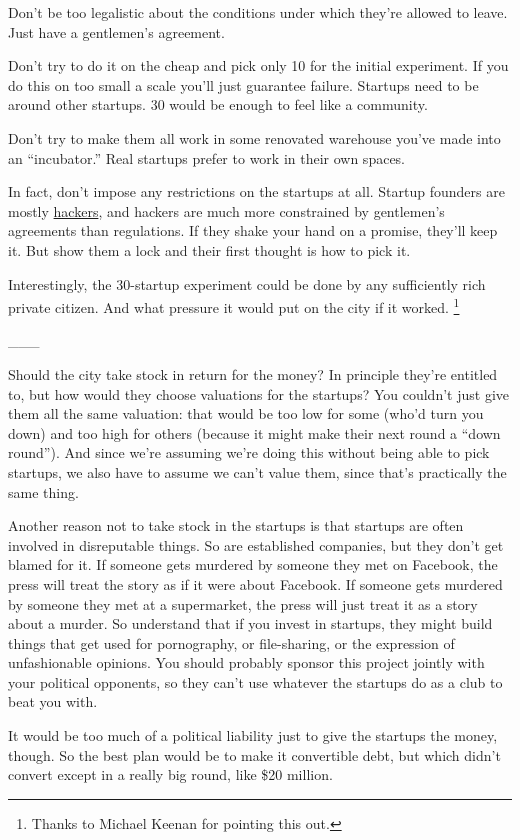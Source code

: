 \documentclass[12pt]{book}
\begin{document}
Don't be too legalistic about the conditions under which they're allowed
to leave. Just have a gentlemen's agreement.

Don't try to do it on the cheap and pick only 10 for the initial
experiment. If you do this on too small a scale you'll just guarantee
failure. Startups need to be around other startups. 30 would be enough
to feel like a community.

Don't try to make them all work in some renovated warehouse you've made
into an ``incubator.'' Real startups prefer to work in their own spaces.

In fact, don't impose any restrictions on the startups at all. Startup
founders are mostly \href{gba.html}{hackers}, and hackers are much more
constrained by gentlemen's agreements than regulations. If they shake
your hand on a promise, they'll keep it. But show them a lock and their
first thought is how to pick it.

Interestingly, the 30-startup experiment could be done by any
sufficiently rich private citizen. And what pressure it would put on the
city if it worked. \footnote{Thanks to Michael Keenan for pointing this out.}

\_\_\_

Should the city take stock in return for the money? In principle they're
entitled to, but how would they choose valuations for the startups? You
couldn't just give them all the same valuation: that would be too low
for some (who'd turn you down) and too high for others (because it might
make their next round a ``down round''). And since we're assuming we're
doing this without being able to pick startups, we also have to assume
we can't value them, since that's practically the same thing.

Another reason not to take stock in the startups is that startups are
often involved in disreputable things. So are established companies, but
they don't get blamed for it. If someone gets murdered by someone they
met on Facebook, the press will treat the story as if it were about
Facebook. If someone gets murdered by someone they met at a supermarket,
the press will just treat it as a story about a murder. So understand
that if you invest in startups, they might build things that get used
for pornography, or file-sharing, or the expression of unfashionable
opinions. You should probably sponsor this project jointly with your
political opponents, so they can't use whatever the startups do as a
club to beat you with.

It would be too much of a political liability just to give the startups
the money, though. So the best plan would be to make it convertible
debt, but which didn't convert except in a really big round, like \$20
million.
\end{document}
